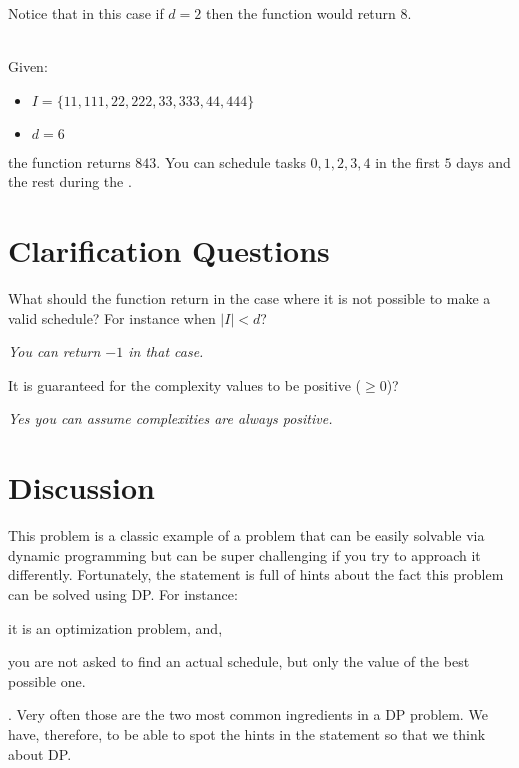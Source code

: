 \begin{exercise}
\begin{example}
        Notice that in this case if $d = 2$ then the function would return $8$.
    \end{example}

    \begin{example}
        \hfill \\
        Given:
        \begin{itemize}
            \item $I = \{11,111,22,222,33,333,44,444\}$
            \item $d = 6$
        \end{itemize}
        the function returns $843$. You can schedule tasks $0,1,2,3,4$ in the first $5$ days and the
        rest during the .
        
    \end{example}
\end{exercise}



\section{Clarification Questions}
        
    \begin{QandA}
            \item What should the function return in the case where it is not possible to make a valid schedule? For instance when $|I| < d$?
        \begin{answered}
            \textit{You can return $-1$ in that case.}
        \end{answered}

        \item It is guaranteed for the complexity values to be positive ($\geq 0$)?
        \begin{answered}
            \textit{Yes you can assume complexities are always positive.}
        \end{answered}
    \end{QandA}

\section{Discussion}
\label{min_difficulty_job_scheduler:sec:discussion}
This problem is a classic example of a problem that can be easily solvable via dynamic programming
but can be super challenging if you try to approach it differently. Fortunately, the
statement is full of hints about the fact this problem can be solved using DP. For instance:
\begin{enumerate*}
    \item it is an optimization problem, and,
    \item you are not asked to find an actual schedule, but only the value of the best
possible one. \end{enumerate*}. Very often those are the two most common ingredients in a DP
problem. We have, therefore, to be able to spot the hints in the statement so that we think about DP.



